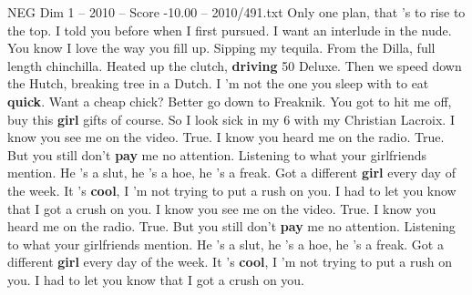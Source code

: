 \begin{textsample}{NEG Dim 1 – 2010 – Score -10.00 – 2010/491.txt}
Only one plan, that 's to rise to the top.
I told you before when I first pursued.
I want an interlude in the nude.
You know I love the way you fill up.
Sipping my tequila.
From the Dilla, full length chinchilla.
Heated up the clutch, \textbf{driving} 50 Deluxe.
Then we speed down the Hutch, breaking tree in a Dutch.
I 'm not the one you sleep with to eat \textbf{quick}.
Want a cheap chick?
Better go down to Freaknik.
You got to hit me off, buy this \textbf{girl} gifts of course.
So I look sick in my 6 with my Christian Lacroix.
I know you see me on the video.
True.
I know you heard me on the radio.
True.
But you still don't \textbf{pay} me no attention.
Listening to what your girlfriends mention.
He 's a slut, he 's a hoe, he 's a freak.
Got a different \textbf{girl} every day of the week.
It 's \textbf{cool}, I 'm not trying to put a rush on you.
I had to let you know that I got a crush on you.
I know you see me on the video.
True.
I know you heard me on the radio.
True.
But you still don't \textbf{pay} me no attention.
Listening to what your girlfriends mention.
He 's a slut, he 's a hoe, he 's a freak.
Got a different \textbf{girl} every day of the week.
It 's \textbf{cool}, I 'm not trying to put a rush on you.
I had to let you know that I got a crush on you.

\end{textsample}
